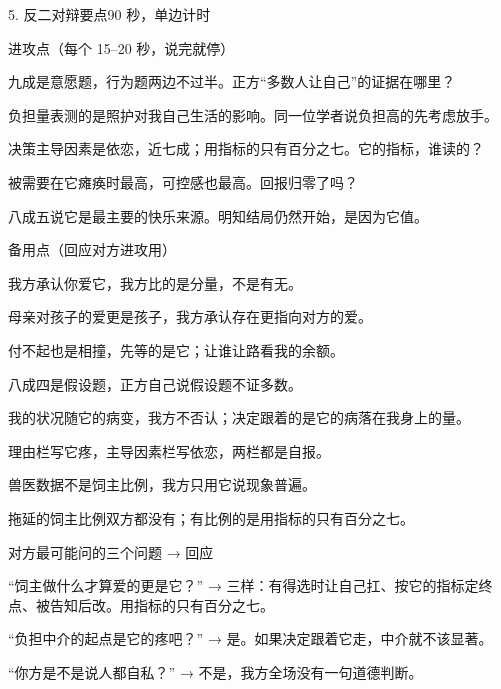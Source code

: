 \documentclass[script,con]{debate}
\begin{document}
\begin{stage}{5. 反二对辩要点}{90 秒，单边计时}
\begin{points}{进攻点（每个 15–20 秒，说完就停）}
\item 九成是意愿题，行为题两边不过半。正方“多数人让自己”的证据在哪里？
\item 负担量表测的是照护对我自己生活的影响。同一位学者说负担高的先考虑放手。
\item 决策主导因素是依恋，近七成；用指标的只有百分之七。它的指标，谁读的？
\item 被需要在它瘫痪时最高，可控感也最高。回报归零了吗？
\item 八成五说它是最主要的快乐来源。明知结局仍然开始，是因为它值。
\end{points}
\begin{points}{备用点（回应对方进攻用）}
\item 我方承认你爱它，我方比的是分量，不是有无。
\item 母亲对孩子的爱更是孩子，我方承认存在更指向对方的爱。
\item 付不起也是相撞，先等的是它；让谁让路看我的余额。
\item 八成四是假设题，正方自己说假设题不证多数。
\item 我的状况随它的病变，我方不否认；决定跟着的是它的病落在我身上的量。
\item 理由栏写它疼，主导因素栏写依恋，两栏都是自报。
\item 兽医数据不是饲主比例，我方只用它说现象普遍。
\item 拖延的饲主比例双方都没有；有比例的是用指标的只有百分之七。
\end{points}
\begin{points}{对方最可能问的三个问题 → 回应}
\item “饲主做什么才算爱的更是它？” → 三样：有得选时让自己扛、按它的指标定终点、被告知后改。用指标的只有百分之七。
\item “负担中介的起点是它的疼吧？” → 是。如果决定跟着它走，中介就不该显著。
\item “你方是不是说人都自私？” → 不是，我方全场没有一句道德判断。
\end{points}
\end{stage}
\end{document}

